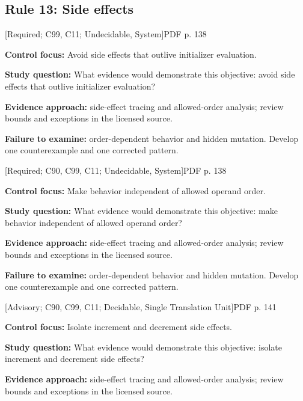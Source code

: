 \documentclass[10pt,letterpaper]{article}
\begin{document}
\subsection{Rule 13: Side effects}
 \textsf{\footnotesize [Required; C99, C11; Undecidable, System]}\hfill{\footnotesize PDF p. 138}\par
\textbf{Control focus:} Avoid side effects that outlive initializer evaluation.\par
\textbf{Study question:} What evidence would demonstrate this objective: avoid side effects that outlive initializer evaluation?\par
\textbf{Evidence approach:} side-effect tracing and allowed-order analysis; review bounds and exceptions in the licensed source.\par
\textbf{Failure to examine:} order-dependent behavior and hidden mutation. Develop one counterexample and one corrected pattern.\par
\smallskip
{}
 \textsf{\footnotesize [Required; C90, C99, C11; Undecidable, System]}\hfill{\footnotesize PDF p. 138}\par
\textbf{Control focus:} Make behavior independent of allowed operand order.\par
\textbf{Study question:} What evidence would demonstrate this objective: make behavior independent of allowed operand order?\par
\textbf{Evidence approach:} side-effect tracing and allowed-order analysis; review bounds and exceptions in the licensed source.\par
\textbf{Failure to examine:} order-dependent behavior and hidden mutation. Develop one counterexample and one corrected pattern.\par
\smallskip
{}
 \textsf{\footnotesize [Advisory; C90, C99, C11; Decidable, Single Translation Unit]}\hfill{\footnotesize PDF p. 141}\par
\textbf{Control focus:} Isolate increment and decrement side effects.\par
\textbf{Study question:} What evidence would demonstrate this objective: isolate increment and decrement side effects?\par
\textbf{Evidence approach:} side-effect tracing and allowed-order analysis; review bounds and exceptions in the licensed source.\par
\end{document}
